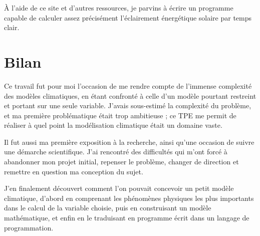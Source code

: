 \documentclass[12pt,a4paper]{article}
\begin{document}
À l'aide de ce site et d'autres ressources, je parvins à écrire un programme capable de calculer assez précisément l'éclairement énergétique solaire par temps clair.


\section{Bilan}
Ce travail fut pour moi l'occasion de me rendre compte de l'immense complexité des modèles climatiques, en étant confronté à celle d'un modèle pourtant restreint et portant sur une seule variable.
J'avais sous-estimé la complexité du problème, et ma première problématique était trop ambitieuse ; ce TPE me permit de réaliser à quel point la modélisation climatique était un domaine vaste.

Il fut aussi ma première exposition à la recherche, ainsi qu'une occasion de suivre une démarche scientifique.
J'ai rencontré des difficultés qui m'ont forcé à abandonner mon projet initial, repenser le problème, changer de direction et remettre en question ma conception du sujet.

J'en finalement découvert comment l'on pouvait concevoir un petit modèle climatique, d'abord en comprenant les phénomènes physiques les plus importants dans le calcul de la variable choisie, puis en construisant un modèle mathématique, et enfin en le traduisant en programme écrit dans un langage de programmation.
\end{document}
